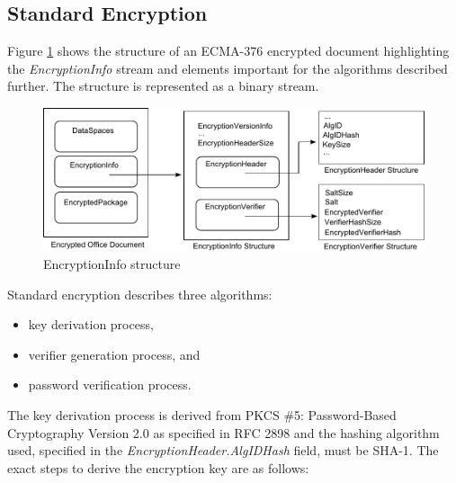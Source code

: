 \documentclass[11pt,oneside]{fithesis2}
\begin{document}
\subsection{Standard Encryption} \label{msoff_standard_enc}

Figure \ref{keys_length} shows the structure of an ECMA-376 encrypted document highlighting the \textit{EncryptionInfo} stream and elements important for the algorithms described further. The structure is represented as a binary stream.

\begin{figure}[ht]
	\centering
	\includegraphics[width=1\textwidth]{figures/ei_struct.pdf}
	\caption{EncryptionInfo structure}
	\label{keys_length}
\end{figure}

Standard encryption describes three algorithms:
\begin{itemize}
	\setlength\itemsep{0.1em}
	\item{key derivation process,}
	\item{verifier generation process, and}
	\item{password verification process.}
\end{itemize}

The key derivation process is derived from PKCS \#5: Password-Based Cryptography Version 2.0 as specified in RFC 2898 \cite{rfc2898} and the hashing algorithm used, specified in the \textit{EncryptionHeader.AlgIDHash} field, must be SHA-1. The exact steps to derive the encryption key are as follows:
\end{document}
